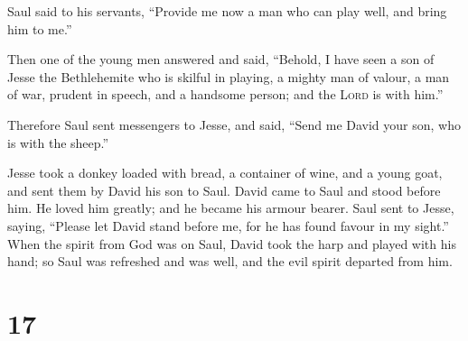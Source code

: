  Saul said to his servants, ``Provide me now a man who
can play well, and bring him to me.''

 Then one of the young men answered and said, ``Behold, I
have seen a son of Jesse the Bethlehemite who is skilful in playing, a
mighty man of valour, a man of war, prudent in speech, and a handsome
person; and the \textsc{Lord} is with him.''

 Therefore Saul sent messengers to Jesse, and said,
``Send me David your son, who is with the sheep.''

 Jesse took a donkey loaded with bread, a container of
wine, and a young goat, and sent them by David his son to Saul.
 David came to Saul and stood before him. He loved him
greatly; and he became his armour bearer.  Saul sent to
Jesse, saying, ``Please let David stand before me, for he has found
favour in my sight.''  When the spirit from God was on
Saul, David took the harp and played with his hand; so Saul was
refreshed and was well, and the evil spirit departed from him.

\hypertarget{section-16}{%
\section{17}\label{section-16}}

